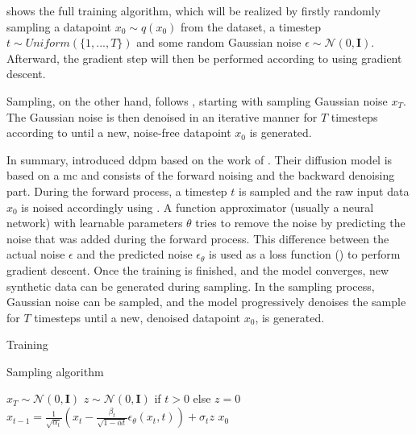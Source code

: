  shows the full training algorithm, which will be realized by firstly randomly sampling a datapoint $x_0 \sim q(x_0)$ from the dataset, a timestep $t\sim Uniform(\{1, ..., T\})$ and some random Gaussian noise $\epsilon \sim \mathcal{N}(0, \textbf{I})$.
Afterward, the gradient step will then be performed according to  using gradient descent.

Sampling, on the other hand, follows , starting with sampling Gaussian noise $x_T$.
The Gaussian noise is then denoised in an iterative manner for $T$ timesteps according to  until a new, noise-free datapoint $x_0$ is generated.

In summary, \cite{ho2020DenoisingDiffusionProbabilistic} introduced \gls{ddpm} based on the work of \cite{sohl-dickstein2015DeepUnsupervisedLearning}.
Their diffusion \gls{model} is based on a \gls{mc} and consists of the forward noising and the backward denoising part.
During the forward process, a timestep $t$ is sampled and the raw input data $x_0$ is noised accordingly using .
A function approximator (usually a neural network) with learnable parameters $\theta$ tries to remove the noise by predicting the noise that was added during the forward process.
This difference between the actual noise $\epsilon$ and the predicted noise $\epsilon_{\theta}$ is used as a loss function () to perform gradient descent.
Once the training is finished, and the \gls{model} converges, new synthetic data can be generated during sampling.
In the sampling process, Gaussian noise can be sampled, and the \gls{model} progressively denoises the sample for $T$ timesteps until a new, denoised datapoint $x_0$, is generated.

\begin{algorithm}[H]
  \caption[Training algorithm]{Training \cite[p. 4]{ho2020DenoisingDiffusionProbabilistic}}
  \label{alg:training}
\end{algorithm}

\begin{algorithm}[H]
  \caption[Sampling algorithm]{Sampling algorithm \cite[p. 4]{ho2020DenoisingDiffusionProbabilistic}}
  \label{alg:sampling}
  \begin{algorithmic}
  \State $x_T \sim \mathcal{N}(0, \mathbf{I})$
  \State $z \sim \mathcal{N}(0, \mathbf{I})$ if $t > 0$ else $z = 0$
  \State $x_{t-1} = \frac{1}{\sqrt{\alpha_t}}\left(x_t - \frac{\beta_t}{\sqrt{1-\bar{\alpha}t}}\epsilon_{\theta}(x_t,t)\right) + \sigma_t z$
  \EndFor
  \State \Return $x_0$
  \end{algorithmic}
\end{algorithm}


